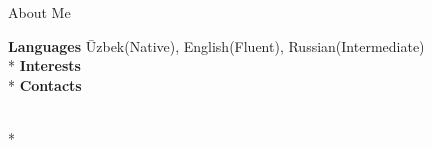 \begin{resume_section}{About Me}
  \begin{nospacetabbing}

  
  \textbf{Languages} \= 
  Uzbek(Native), English(Fluent), Russian(Intermediate)
  \\*
  \textbf{Interests} \> \interests  \\*
  \textbf{Contacts} \> 
  \contactdetails
  
  \\*
  \end{nospacetabbing}

\end{resume_section}
